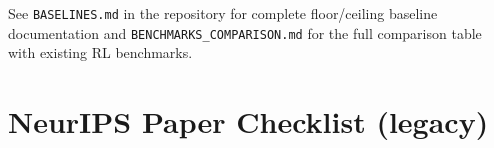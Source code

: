 \documentclass{article}
\begin{document}
See \texttt{BASELINES.md} in the repository for complete floor/ceiling baseline documentation
and \texttt{BENCHMARKS\_COMPARISON.md} for the full comparison table with existing RL benchmarks.





\iffalse

\section*{NeurIPS Paper Checklist (legacy)}
\end{document}
